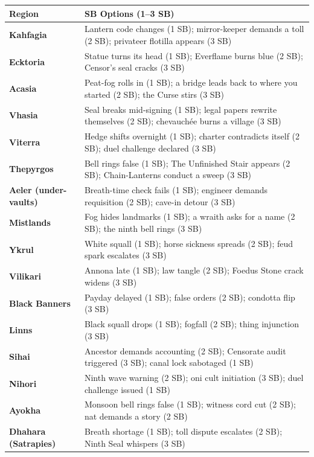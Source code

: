 \documentclass[11pt,letterpaper,twoside]{book}
\begin{document}
\begin{longtable}{|p{3cm}|p{9cm}|}
\hline
\rowcolor{gray!20}
\textbf{Region} & \textbf{SB Options (1--3 SB)} \\
\hline
\textbf{Kahfagia} & Lantern code changes (1 SB); mirror-keeper demands a toll (2 SB); privateer flotilla appears (3 SB) \\
\hline
\textbf{Ecktoria} & Statue turns its head (1 SB); Everflame burns blue (2 SB); Censor's seal cracks (3 SB) \\
\hline
\textbf{Acasia} & Peat-fog rolls in (1 SB); a bridge leads back to where you started (2 SB); the Curse stirs (3 SB) \\
\hline
\textbf{Vhasia} & Seal breaks mid-signing (1 SB); legal papers rewrite themselves (2 SB); chevauchée burns a village (3 SB) \\
\hline
\textbf{Viterra} & Hedge shifts overnight (1 SB); charter contradicts itself (2 SB); duel challenge declared (3 SB) \\
\hline
\textbf{Thepyrgos} & Bell rings false (1 SB); The Unfinished Stair appears (2 SB); Chain-Lanterns conduct a sweep (3 SB) \\
\hline
\textbf{Aeler (under-vaults)} & Breath-time check fails (1 SB); engineer demands requisition (2 SB); cave-in detour (3 SB) \\
\hline
\textbf{Mistlands} & Fog hides landmarks (1 SB); a wraith asks for a name (2 SB); the ninth bell rings (3 SB) \\
\hline
\textbf{Ykrul} & White squall (1 SB); horse sickness spreads (2 SB); feud spark escalates (3 SB) \\
\hline
\textbf{Vilikari} & Annona late (1 SB); law tangle (2 SB); Foedus Stone crack widens (3 SB) \\
\hline
\textbf{Black Banners} & Payday delayed (1 SB); false orders (2 SB); condotta flip (3 SB) \\
\hline
\textbf{Linns} & Black squall drops (1 SB); fogfall (2 SB); thing injunction (3 SB) \\
\hline
\textbf{Sihai} & Ancestor demands accounting (2 SB); Censorate audit triggered (3 SB); canal lock sabotaged (1 SB) \\
\hline
\textbf{Nihori} & Ninth wave warning (2 SB); oni cult initiation (3 SB); duel challenge issued (1 SB) \\
\hline
\textbf{Ayokha} & Monsoon bell rings false (1 SB); witness cord cut (2 SB); nat demands a story (2 SB) \\
\hline
\textbf{Dhahara (Satrapies)} & Breath shortage (1 SB); toll dispute escalates (2 SB); Ninth Seal whispers (3 SB) \\

\end{longtable}
\end{document}
